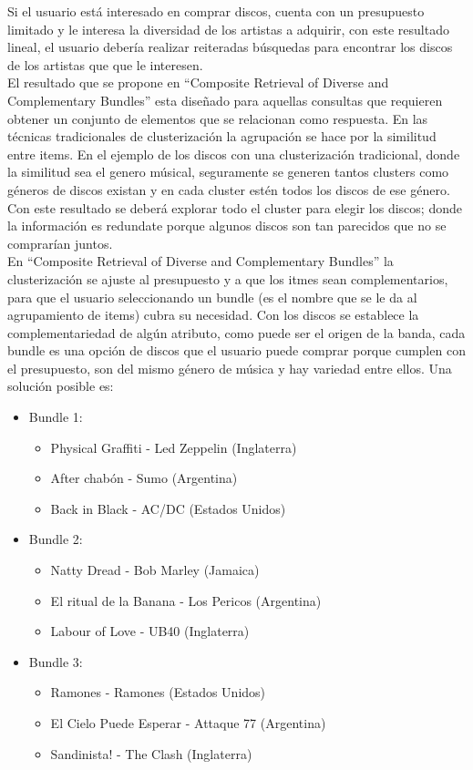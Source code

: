 Si el usuario está interesado en comprar discos, cuenta con un presupuesto limitado y le interesa la diversidad de los artistas a adquirir, con este resultado lineal, el usuario debería realizar reiteradas búsquedas para encontrar los discos de los artistas que que le interesen.\\

El resultado que se propone en ``Composite Retrieval of Diverse and Complementary Bundles'' esta diseñado para aquellas consultas 
que requieren obtener un conjunto de elementos que se relacionan como respuesta. En las técnicas tradicionales de 
clusterización la agrupación se hace por la similitud entre items. En el ejemplo de los discos con una clusterización tradicional,
donde la similitud sea el genero músical, seguramente se generen tantos clusters como géneros de discos existan y en cada cluster estén todos los discos de ese género. Con este resultado se deberá explorar todo el cluster para elegir los discos; donde la información es redundate porque algunos discos son tan parecidos que no se comprarían juntos.\\

En ``Composite Retrieval of Diverse and Complementary Bundles'' la clusterización se ajuste al presupuesto y a que los itmes sean complementarios, para que el usuario seleccionando un bundle (es el nombre que se le da al agrupamiento de items) cubra su necesidad. Con los discos se establece la complementariedad de algún atributo, como puede ser el origen de la banda, cada bundle es una opción de discos que el usuario puede comprar porque cumplen con el presupuesto, son del mismo género de música y hay variedad entre ellos. Una solución posible es:
\begin{itemize}
  \item Bundle 1:
  \begin{itemize}
    \item Physical Graffiti - Led Zeppelin (Inglaterra)
    \item After chabón - Sumo (Argentina)
    \item Back in Black - AC/DC (Estados Unidos)
  \end{itemize}
  \item Bundle 2:
  \begin{itemize}
    \item Natty Dread - Bob Marley (Jamaica)
    \item El ritual de la Banana - Los Pericos (Argentina)
    \item Labour of Love - UB40 (Inglaterra)
  \end{itemize}
	  \item Bundle 3:
  \begin{itemize}
    \item Ramones - Ramones (Estados Unidos)
    \item El Cielo Puede Esperar - Attaque 77 (Argentina)
    \item Sandinista! - The Clash (Inglaterra)
  \end{itemize}
\end{itemize}

